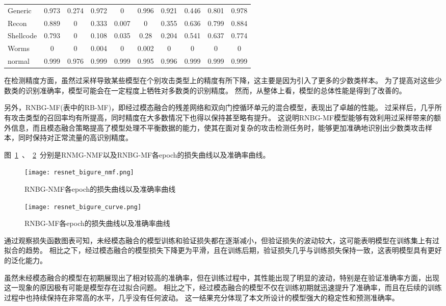 \begin{table}[htbp]
\begin{tabular}{lccccccccc}
		Generic   & 0.973 & 0.274 & 0.972 & 0     & 0.996 & 0.921 & 0.446 & 0.801  & 0.978 \\
		Recon     & 0.889 & 0     & 0.333 & 0.007 & 0     & 0.355 & 0.636 & 0.799  & 0.884 \\
		Shellcode & 0.793 & 0     & 0.108 & 0.035 & 0.28  & 0.204 & 0.541 & 0.637  & 0.774 \\
		Worms     & 0     & 0     & 0.004 & 0     & 0.002 & 0     & 0     & 0      & 0     \\
		normal    & 0.999 & 0.976 & 0.999 & 0.999 & 0.995 & 0.996 & 0.999 & 0.999  & 0.999 \\
		\bottomrule
	\end{tabular}
\end{table}
在检测精度方面，虽然过采样导致某些模型在个别攻击类型上的精度有所下降，这主要是因为引入了更多的少数类样本。
为了提高对这些少数类的识别准确率，模型可能会在一定程度上牺牲对多数类的识别精度。
然而，从整体上看，模型的总体性能是得到了改善的。\par

另外，RNBG-MF(表中的RB-MF)，即经过模态融合的残差网络和双向门控循环单元的混合模型，表现出了卓越的性能。
过采样后，几乎所有攻击类型的召回率均有所提高，同时精度在大多数情况下也得以保持甚至略有提升。
这说明RNBG-MF模型能够有效利用过采样带来的额外信息，而且模态融合策略提高了模型处理不平衡数据的能力，使其在面对复杂的攻击检测任务时，能够更加准确地识别出少数类攻击样本，同时保持对正常流量的高识别精度。\par


图~\ref{fig:ResNet-BiGRU-NoFusion-loss}~、~\ref{fig:ResNet-BiGRU-Fusion-loss}~分别是RNMG-NMF以及RNBG-MF各epoch的损失曲线以及准确率曲线。
\begin{figure}[htbp]
	\centering
	\texttt{[image: resnet\_bigure\_nmf.png]}
	\caption{RNBG-NMF各epoch的损失曲线以及准确率曲线}
	\label{fig:ResNet-BiGRU-NoFusion-loss}
\end{figure}

\begin{figure}[htbp]
	\centering
	\texttt{[image: resnet\_bigure\_curve.png]}
	\caption{RNBG-MF各epoch的损失曲线以及准确率曲线}
	\label{fig:ResNet-BiGRU-Fusion-loss}
\end{figure}
通过观察损失函数图表可知，未经模态融合的模型训练和验证损失都在逐渐减小，但验证损失的波动较大，这可能表明模型在训练集上有过拟合的趋势。
相比之下，经过模态融合的模型损失下降更为平滑，且在训练后期，验证损失几乎与训练损失保持一致，这表明模型具有更好的泛化能力。\par
虽然未经模态融合的模型在初期展现出了相对较高的准确率，但在训练过程中，其性能出现了明显的波动，特别是在验证准确率方面，出现这一现象的原因极有可能是模型存在过拟合问题。
相比之下，经过模态融合的模型不仅在训练初期就迅速提升了准确率，而且在后续的训练过程中也持续保持在非常高的水平，几乎没有任何波动。
这一结果充分体现了本文所设计的模型强大的稳定性和预测准确率。\par

